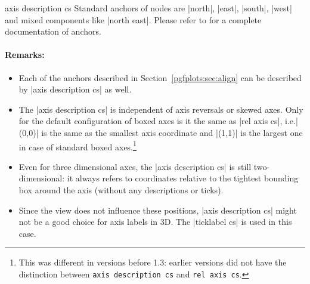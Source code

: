 \begin{coordinatesystem}{axis description cs}
    Standard anchors of nodes are |north|, |east|, |south|, |west| and mixed
    components like |north east|. Please refer to \cite{tikz} for a complete
    documentation of anchors.


    \paragraph{Remarks:}

    \begin{itemize}
        \item Each of the anchors described in
            Section~\ref{pgfplots:sec:align} can be described by
            |axis description cs| as well.
        \item The |axis description cs| is independent of axis reversals or
            skewed axes. Only for the default configuration of boxed axes is
            it the same as |rel axis cs|, i.e.\@ |(0,0)| is the same as the
            smallest axis coordinate and |(1,1)| is the largest one in case
            of standard boxed axes.\footnote{This was different in versions
            before 1.3: earlier versions did not have the distinction between
            \texttt{axis description cs} and \texttt{rel axis cs}.}
        \item Even for three dimensional axes, the |axis description cs| is
            still two-dimensional: it always refers to coordinates relative
            to the tightest bounding box around the axis (without any
            descriptions or ticks).
\begin{codeexample}[width=4cm]
\end{codeexample}
        \item Since the view does not influence these positions,
        |axis description cs| might not be a good choice for axis labels in 3D.
        The |ticklabel cs| is used in this case.
    \end{itemize}
\end{coordinatesystem}

